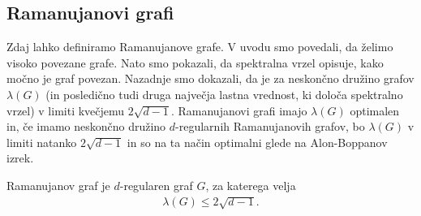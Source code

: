 \subsection{Ramanujanovi grafi}
Zdaj lahko definiramo Ramanujanove grafe. V uvodu smo povedali, da želimo visoko povezane grafe. Nato smo pokazali, da spektralna vrzel opisuje, kako močno je graf povezan. Nazadnje smo dokazali, da je za neskončno družino grafov \(\lambda(G)\) (in posledično tudi druga največja lastna vrednost, ki določa spektralno vrzel) v limiti kvečjemu \(2\sqrt{d-1}\). Ramanujanovi grafi imajo \(\lambda(G)\) optimalen in, če imamo neskončno družino \(d\)-regularnih Ramanujanovih grafov, bo \(\lambda(G)\) v limiti natanko \(2\sqrt{d-1}\) in so na ta način optimalni glede na Alon-Boppanov izrek.

\begin{definicija}
    Ramanujanov graf je \(d\)-regularen graf \(G\), za katerega velja
    \begin{align*}
        \lambda(G) \leq 2\sqrt{d-1}.
    \end{align*}
\end{definicija}


